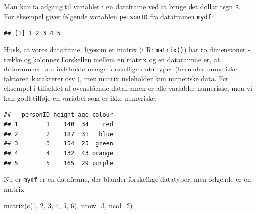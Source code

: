 \documentclass[
]{book}
\newenvironment{Shaded}{\begin{snugshade}}{\end{snugshade}}
\newcommand{\AttributeTok}[1]{\textcolor[rgb]{0.77,0.63,0.00}{#1}}
\newcommand{\CommentTok}[1]{\textcolor[rgb]{0.56,0.35,0.01}{\textit{#1}}}
\newcommand{\DecValTok}[1]{\textcolor[rgb]{0.00,0.00,0.81}{#1}}
\newcommand{\FunctionTok}[1]{\textcolor[rgb]{0.00,0.00,0.00}{#1}}
\newcommand{\NormalTok}[1]{#1}
\newcommand{\OtherTok}[1]{\textcolor[rgb]{0.56,0.35,0.01}{#1}}
\newcommand{\SpecialCharTok}[1]{\textcolor[rgb]{0.00,0.00,0.00}{#1}}
\newcommand{\StringTok}[1]{\textcolor[rgb]{0.31,0.60,0.02}{#1}}
\begin{document}
Man kan fa adgang til variabler i en dataframe ved at bruge det dollar tegn \texttt{\$}. For eksempel giver følgende variablen \texttt{personID} fra dataframen \texttt{mydf}:

\begin{Shaded}
\end{Shaded}

\begin{verbatim}
## [1] 1 2 3 4 5
\end{verbatim}

Husk, at vores dataframe, ligesom et matrix (i R: \texttt{matrix()}) har to dimensioner - række og kolonner Forskellen mellem en matrix og en dataramme er, at datarammer kan indeholde mange forskellige data typer (herunder numeriske, faktorer, karakterer osv.), men matrix indeholder kun numeriske data. For eksempel i tilfældet af ovenstående dataframen er alle variabler numeriske, men vi kan godt tilføje en variabel som er ikke-numeriske:

\begin{Shaded}
\end{Shaded}

\begin{verbatim}
##   personID height age colour
## 1        1    140  34    red
## 2        2    187  31   blue
## 3        3    154  25  green
## 4        4    132  43 orange
## 5        5    165  29 purple
\end{verbatim}

Nu er \texttt{mydf} er en dataframe, der blander forskellige datatyper, men følgende er en matrix

\begin{Shaded}
\begin{Highlighting}[]
\FunctionTok{matrix}\NormalTok{(}\FunctionTok{c}\NormalTok{(}\DecValTok{1}\NormalTok{, }\DecValTok{2}\NormalTok{, }\DecValTok{3}\NormalTok{, }\DecValTok{4}\NormalTok{, }\DecValTok{5}\NormalTok{, }\DecValTok{6}\NormalTok{), }
    \AttributeTok{nrow=}\DecValTok{3}\NormalTok{,}
    \AttributeTok{ncol=}\DecValTok{2}\NormalTok{)}
\end{Highlighting}
\end{Shaded}
\end{document}
